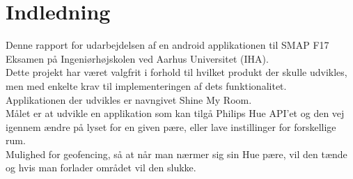\chapter{Indledning}
Denne rapport for udarbejdelsen af en android applikationen til SMAP F17 Eksamen på Ingeniørhøjskolen
ved Aarhus Universitet (IHA).\\
Dette projekt har været valgfrit i forhold til hvilket produkt der skulle udvikles, men med
enkelte krav til implementeringen af dets funktionalitet.\\
Applikationen der udvikles er navngivet Shine My Room.\\
\newline
Målet er at udvikle en applikation som kan tilgå Philips Hue API'et og den vej igennem ændre på lyset for en given pære, eller lave instillinger for forskellige rum. \\
Mulighed for geofencing, så at når man nærmer sig sin Hue pære, vil den tænde og hvis man forlader området vil den slukke.
\newline